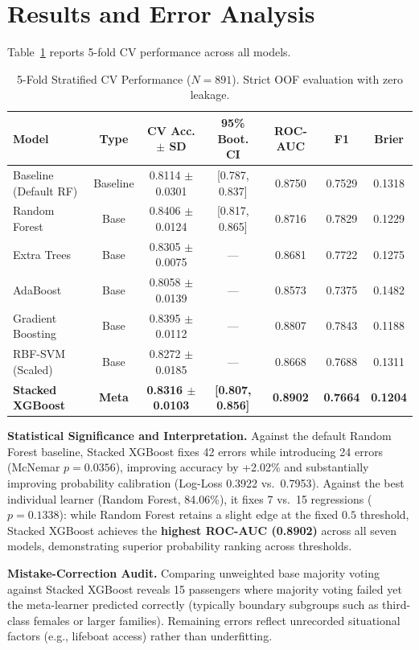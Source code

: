 \documentclass{article}
\begin{document}
\section{Results and Error Analysis}
Table~\ref{tab:main_results} reports 5-fold CV performance across all models.

\begin{table}[h]
\centering
\caption{5-Fold Stratified CV Performance ($N=891$). Strict OOF evaluation with zero leakage.}
\label{tab:main_results}
\small
\begin{tabular}{@{}lcccccc@{}}
\toprule
\textbf{Model} & \textbf{Type} & \textbf{CV Acc. $\pm$ SD} & \textbf{95\% Boot. CI} & \textbf{ROC-AUC} & \textbf{F1} & \textbf{Brier} \\
\midrule
Baseline (Default RF) & Baseline & 0.8114 $\pm$ 0.0301 & [0.787, 0.837] & 0.8750 & 0.7529 & 0.1318 \\
\midrule
Random Forest & Base & 0.8406 $\pm$ 0.0124 & [0.817, 0.865] & 0.8716 & 0.7829 & 0.1229 \\
Extra Trees & Base & 0.8305 $\pm$ 0.0075 & --- & 0.8681 & 0.7722 & 0.1275 \\
AdaBoost & Base & 0.8058 $\pm$ 0.0139 & --- & 0.8573 & 0.7375 & 0.1482 \\
Gradient Boosting & Base & 0.8395 $\pm$ 0.0112 & --- & 0.8807 & 0.7843 & 0.1188 \\
RBF-SVM (Scaled) & Base & 0.8272 $\pm$ 0.0185 & --- & 0.8668 & 0.7688 & 0.1311 \\
\midrule
\textbf{Stacked XGBoost} & \textbf{Meta} & \textbf{0.8316 $\pm$ 0.0103} & \textbf{[0.807, 0.856]} & \textbf{0.8902} & \textbf{0.7664} & \textbf{0.1204} \\
\bottomrule
\end{tabular}
\end{table}

\textbf{Statistical Significance and Interpretation.} Against the default Random Forest baseline, Stacked XGBoost fixes 42 errors while introducing 24 errors (McNemar $p = 0.0356$), improving accuracy by +2.02\% and substantially improving probability calibration (Log-Loss 0.3922 vs.\ 0.7953). Against the best individual learner (Random Forest, 84.06\%), it fixes 7 vs.\ 15 regressions ($p = 0.1338$): while Random Forest retains a slight edge at the fixed $0.5$ threshold, Stacked XGBoost achieves the \textbf{highest ROC-AUC (0.8902)} across all seven models, demonstrating superior probability ranking across thresholds.

\textbf{Mistake-Correction Audit.} Comparing unweighted base majority voting against Stacked XGBoost reveals 15 passengers where majority voting failed yet the meta-learner predicted correctly (typically boundary subgroups such as third-class females or larger families). Remaining errors reflect unrecorded situational factors (e.g., lifeboat access) rather than underfitting.
\end{document}
